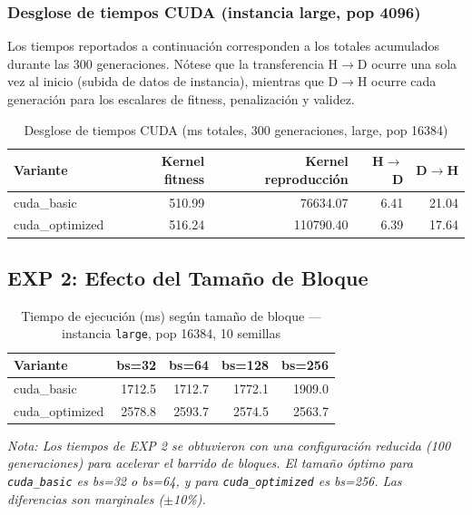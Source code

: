 \subsubsection{Desglose de tiempos CUDA (instancia large, pop 4096)}

Los tiempos reportados a continuación corresponden a los totales acumulados
durante las 300 generaciones. Nótese que la transferencia H$\to$D ocurre una
sola vez al inicio (subida de datos de instancia), mientras que D$\to$H ocurre
cada generación para los escalares de fitness, penalización y validez.

\begin{table}[H]
  \centering
  \caption{Desglose de tiempos CUDA (ms totales, 300 generaciones, large, pop 16384)}
  \label{tab:exp1_cuda}
  \begin{tabular}{lrrrr}
    \toprule
    \textbf{Variante} &
    \textbf{Kernel fitness} &
    \textbf{Kernel reproducción} &
    \textbf{H$\to$D} &
    \textbf{D$\to$H} \\
    \midrule
    cuda\_basic      & 510.99 & 76634.07 & 6.41 & 21.04 \\
    cuda\_optimized  & 516.24 & 110790.40 & 6.39 & 17.64 \\
    \bottomrule
  \end{tabular}
\end{table}
\subsection{EXP 2: Efecto del Tamaño de Bloque}

\begin{table}[H]
  \centering
  \caption{Tiempo de ejecución (ms) según tamaño de bloque — instancia \texttt{large}, pop 16384, 10 semillas}
  \label{tab:exp2}
  \begin{tabular}{lrrrr}
    \toprule
    \textbf{Variante} & \textbf{bs=32} & \textbf{bs=64} & \textbf{bs=128} &
    \textbf{bs=256} \\
    \midrule
    cuda\_basic      & 1712.5 & 1712.7 & 1772.1 & 1909.0 \\
    cuda\_optimized  & 2578.8 & 2593.7 & 2574.5 & 2563.7 \\
    \bottomrule
  \end{tabular}
\end{table}
\textit{Nota: Los tiempos de EXP 2 se obtuvieron con una configuración
reducida (100 generaciones) para acelerar el barrido de bloques. El tamaño
óptimo para \texttt{cuda\_basic} es bs=32 o bs=64, y para
\texttt{cuda\_optimized} es bs=256. Las diferencias son marginales ($\pm$10\%).}

